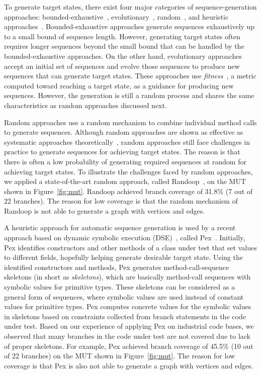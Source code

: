 \documentclass{sig-alternate}
\begin{document}
To generate target states, there exist four major categories of sequence-generation approaches: bounded-exhaustive~\cite{khurshid:symbolic, xie:rostra}, evolutionary~\cite{tonella:etoc,  inkumsah08:improving},  random~\cite{csallner:jcrasher, JTEST, pacheco:feedback}, and heuristic approaches~\cite{tillman:pexwhite}. Bounded-exhaustive approaches generate sequences exhaustively up to a small bound of sequence length. However, generating target states often requires longer sequences beyond the small bound that can be handled by the bounded-exhaustive approaches. On the other hand, evolutionary approaches accept an initial set of sequences and evolve those sequences to produce new sequences that can generate target states. These approaches use \emph{fitness}~\cite{Xiyang:fitness}, a metric computed toward reaching a target state, as a guidance for producing new sequences. However, the generation is still a random process and shares the same characteristics as random approaches discussed next. 

Random approaches use a random mechanism to combine individual method calls to generate sequences. Although random approaches are shown as effective as systematic approaches theoretically~\cite{random:duran}, random approaches still face challenges in practice to generate sequences for achieving target states. The reason is that there is often a low probability of generating required sequences at random for achieving target states. To illustrate the challenges faced by random approaches, we applied a state-of-the-art random approach, called Randoop~\cite{pacheco:feedback}, on the MUT shown in Figure~\ref{fig:mut}. Randoop achieved branch coverage of 31.8\% (7 out of 22 branches). The reason for low coverage is that the random mechanism of Randoop is not able to generate a graph with vertices and edges. 

A heuristic approach for automatic sequence generation is used by a recent approach based on dynamic symbolic execution (DSE)~\cite{king:symex, Clarke:symbolic, godefroid:dart, koushik:cute}, called Pex~\cite{tillman:pexwhite}. Initially, Pex identifies constructors and other methods of a class under test that set values to different fields, hopefully helping generate desirable target state. Using the identified constructors and methods, Pex generates method-call-sequence skeletons (in short as \emph{skeletons}), which are basically method-call sequences with symbolic values for primitive types. These skeletons can be considered as a general form of sequences, where symbolic values are used instead of constant values for primitive types. Pex computes concrete values for the symbolic values in skeletons based on constraints collected from branch statements in the code under test. Based on our experience of applying Pex on industrial code bases, we observed that many branches in the code under test are not covered due to lack of proper skeletons. For example, Pex achieved branch coverage of 45.5\% (10 out of 22 branches) on the MUT shown in Figure~\ref{fig:mut}. The reason for low coverage is that Pex is also not able to generate a graph with vertices and edges.
\end{document}
